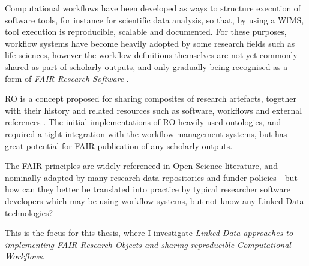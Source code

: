 Computational \glspl{workflow} have been developed as ways to structure execution of software tools, for instance for scientific data analysis, so that, by using a \gls{WfMS}, tool execution is reproducible, scalable and documented. For these purposes, workflow systems have become heavily adopted by some research fields such as life sciences, however the workflow definitions themselves are not yet commonly shared as part of scholarly outputs, and only gradually being recognised as a form of \emph{FAIR Research Software} \cite{Katz 2021b}. 

\acrfull{RO} is a concept proposed for sharing composites of research artefacts, together with their history and related resources such as software, workflows and external references \cite{Bechhofer 2013}. The initial implementations of RO heavily used ontologies, and required a tight integration with the workflow management systems, but has great potential for FAIR publication of any scholarly outputs.
 
The FAIR principles are widely referenced in Open Science literature, and nominally adapted by many research data repositories and funder policies---but how can they better be translated into practice by typical researcher software developers which may be using workflow systems, but not know any Linked Data technologies? 

This is the focus for this thesis, where I investigate \emph{Linked Data approaches to implementing FAIR Research Objects and sharing reproducible Computational Workflows}.



